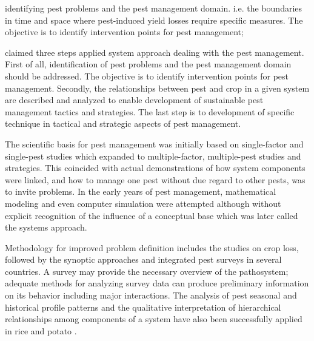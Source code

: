 



identifying pest problems and the pest management domain. i.e. the boundaries in time and space where pest-induced yield losses require specific measures. The objective is to identify intervention points for pest management;

\citet{teng1992implementing} claimed three steps applied system approach dealing with the pest management. First of all, identification of pest problems and the pest management domain should be addressed. The objective is to identify intervention points for pest management. Secondly, the relationships between pest and crop in a given system are described and analyzed to enable development of sustainable pest management tactics and strategies. The last step is to development of specific technique in tactical and strategic aspects of pest management.

The scientific basis for pest management was initially based on single-factor and single-pest studies which expanded to multiple-factor, multiple-pest studies and strategies. This coincided with actual demonstrations of how system components were linked, and how to manage one pest without due regard to other pests, was to invite problems. In the early years of pest management, mathematical modeling and even computer simulation were attempted although without explicit recognition of the influence of a conceptual base which was later called the systems approach.

Methodology for improved problem definition includes the studies on crop loss, followed by the synoptic approaches and integrated pest surveys in several countries. A survey may provide the necessary overview of the pathosystem; adequate methods for analyzing survey data can produce preliminary information on its behavior including major interactions. The analysis of pest seasonal and historical profile patterns and the qualitative interpretation of hierarchical relationships among components of a system have also been successfully applied in rice and potato \citep{teng1992implementing, heong1985systems}. 

